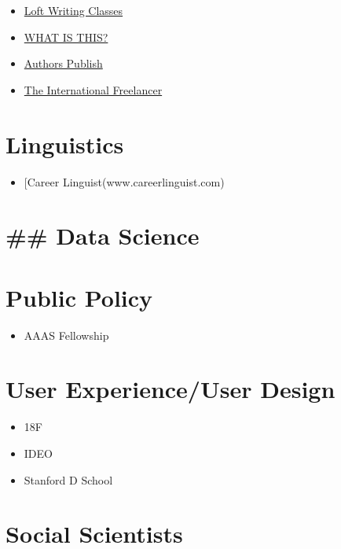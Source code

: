 \documentclass[]{book}
\providecommand{\tightlist}{%
  \setlength{\itemsep}{0pt}\setlength{\parskip}{0pt}}
\theoremstyle{definition}
\theoremstyle{definition}
\theoremstyle{definition}
\theoremstyle{remark}
\begin{document}
\begin{itemize}
\tightlist
\item
  \href{www.loft.org}{Loft Writing Classes}
\item
  \href{www.pw.org}{WHAT IS THIS?}
\item
  \href{https://www.authorspublish.com/}{Authors Publish}
\item
  \href{http://www.theinternationalfreelancer.com/}{The International
  Freelancer}
\end{itemize}

\section{Linguistics}\label{linguistics}

\begin{itemize}
\tightlist
\item
  {[}Career Linguist(www.careerlinguist.com)
\end{itemize}

\section{\#\# Data Science}\label{data-science}

\section{Public Policy}\label{public-policy}

\begin{itemize}
\tightlist
\item
  AAAS Fellowship
\end{itemize}

\section{User Experience/User Design}\label{user-experienceuser-design}

\begin{itemize}
\tightlist
\item
  18F
\item
  IDEO
\item
  Stanford D School
\end{itemize}

\section{Social Scientists}\label{social-scientists}
\end{document}
